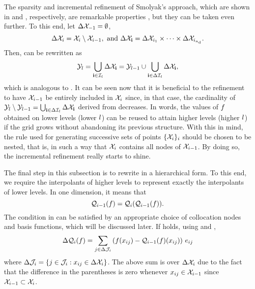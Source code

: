 The sparsity and incremental refinement of Smolyak's approach, which are shown
in  and , respectively, are
remarkable properties \perse, but they can be taken even further. To this end,
let $\Delta\mathcal{X}_{-1} = \emptyset$,
\[
  \Delta\mathcal{X}_i = \mathcal{X}_i \setminus \mathcal{X}_{i - 1}, \text{ and } \Delta\mathcal{X}_{\mathbf{i}} = \Delta\mathcal{X}_{i_1} \times \cdots \times \Delta\mathcal{X}_{i_{n_\text{d}}}.
\]
Then,  can be rewritten as
\begin{equation} \elab{smolyak-grid-incremental}
  \Y_\l = \bigcup_{\vi \in \lindex_\l} \Delta\X_\vi = \Y_{\l - 1} \cup \bigcup_{\vi \in \Delta\lindex_\l} \Delta\X_\vi,
\end{equation}
which is analogous to . It can be seen now that it is
beneficial to the refinement to have $\mathcal{X}_{i - 1}$ be entirely included in $\mathcal{X}_i$
since, in that case, the cardinality of $\mathcal{Y}_l \setminus \mathcal{Y}_{l - 1} =
\bigcup_{\mathbf{i} \in \Delta\mathcal{I}_l} \Delta\mathcal{X}_{\mathbf{i}}$ derived from
 decreases. In words, the values of $f$ obtained
on lower levels (lower $l$) can be reused to attain higher levels (higher $l$)
if the grid grows without abandoning its previous structure. With this in mind,
the rule used for generating successive sets of points $\{ \mathcal{X}_i \}_i$ should be
chosen to be nested, that is, in such a way that $\mathcal{X}_i$ contains all nodes of
$\mathcal{X}_{i - 1}$. By doing so, the incremental refinement really starts to shine.

The final step in this subsection is to rewrite  in a
hierarchical form. To this end, we require the interpolants of higher levels to
represent exactly the interpolants of lower levels. In one dimension, it means
that
\begin{equation} \elab{tensor-exactness}
  \tensor{i - 1}(\f) = \tensor{i}(\tensor{i - 1}(\f)).
\end{equation}
The condition in  can be satisfied by an appropriate
choice of collocation nodes and basis functions, which will be discussed later.
If  holds, using  and
,
\[
  \Delta\mathcal{Q}_{i}(f) = \sum_{j \in \Delta\mathcal{J}_i} \left( f(x_{ij}) - \mathcal{Q}_{i - 1}(f)(x_{ij}) \right) \, e_{ij}
\]
where $\Delta\mathcal{J}_i = \{ j \in \mathcal{J}_i: x_{ij} \in \Delta\mathcal{X}_i \}$. The
above sum is over $\Delta\mathcal{X}_i$ due to the fact that the difference in the
parentheses is zero whenever $x_{ij} \in \mathcal{X}_{i - 1}$ since $\mathcal{X}_{i - 1} \subset
\mathcal{X}_i$.

